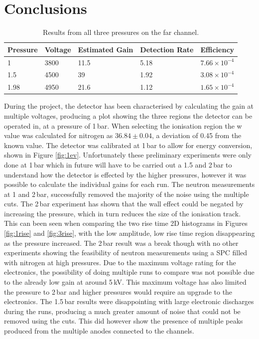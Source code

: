 \documentclass[a4paper]{article}
\begin{document}
\section{Conclusions}
\begin{table}[H]
\centering
\caption{Results from all three pressures on the far channel.}
\begin{tabular}{|l|l|l|l|l|} 
\hline
Pressure & Voltage & Estimated Gain & Detection Rate & Efficiency  \\ 
\hline
1       & 3800    & 11.5              & 5.18           & $7.66 \times 10^{-4}$      \\
1.5     & 4500    & 39              & 1.92           & $3.08 \times 10^{-4}$          \\
1.98    & 4950    & 21.6              & 1.12           & $1.65 \times 10^{-4}$          \\
\hline
\end{tabular}
\label{tb:fin}
\end{table}
During the project, the detector has been characterised by calculating the gain at multiple voltages, producing a plot showing the three regions the detector can be operated in, at a pressure of 1\,bar. When selecting the ionisation region the w value was calculated for nitrogen as $36.84 \pm 0.04$, a deviation of 0.45 from the known value. The detector was calibrated at 1\,bar to allow for energy conversion, shown in Figure \ref{fig:1ev}. Unfortunately these preliminary experiments were only done at 1\,bar which in future will have to be carried out a 1.5 and 2\,bar to understand how the detector is effected by the higher pressures, however it was possible to calculate the individual gains for each run.
\newline The neutron measurements at 1 and 2\,bar, successfully removed the majority of the noise using the multiple cuts. The 2\,bar experiment has shown that the wall effect could be negated by increasing the pressure, which in turn reduces the size of the ionisation track. This can been seen when comparing the two rise time 2D histograms in Figures \ref{fig:1rise} and \ref{fig:3rise}, with the low amplitude, low rise time region disappearing as the pressure increased. The 2\,bar result was a break though with no other experiments showing the feasibility of neutron measurements using a SPC filled with nitrogen at high pressures. Due to the maximum voltage rating for the electronics, the possibility of doing multiple runs to compare was not possible due to the already low gain at around 5\,kV. This maximum voltage has also limited the pressure to 2\,bar and higher pressures would require an upgrade to the electronics. The 1.5\,bar results were disappointing with large electronic discharges during the runs, producing a much greater amount of noise that could not be removed using the cuts. This did however show the presence of multiple peaks produced from the multiple anodes connected to the channels.
\end{document}
